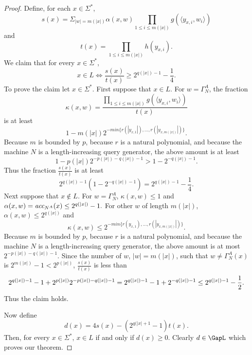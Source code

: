 \documentclass{amsbook}
\theoremstyle{definition}
\theoremstyle{remark}
\numberwithin{section}{chapter}
\numberwithin{equation}{chapter}
\newcommand{\acc}{\mbox{\it acc}}
\begin{document}
\begin{proof}
Define, for each $x\in\Sigma^*$,
\[
s(x)=\Sigma_{|w|=m(|x|)}\alpha (x,w)\prod_{1\leq i\leq m(|x|)}g(\langle y_{x,i},w_i\rangle )
\]
and
\[
t(x)=\prod_{1\leq i\leq m(|x|)}h(y_{x,i}).
\]
We claim that for every $x\in\Sigma^*$,
\[
x\in L\Leftrightarrow \frac{s(x)}{t(x)}\geq 2^{q(|x|)-1}-\frac{1}{4}.
\]
To prove the claim let $x\in\Sigma^*$. First suppose that $x\in L$. For $w=\Gamma_N^A$, the fraction
\[
\kappa (x,w)=\frac{\prod_{1\leq i\leq m(|x|)}g(\langle y_{x,i},w_i\rangle )}{t(x)}
\]
is at least
\[
1-m(|x|)2^{-min\{r(|y_{x,1}|),\ldots ,r(|y_{x,m(|x|)}|)\}}.
\]
Because $m$ is bounded by $p$, because $r$ is a natural polynomial, and because the machine $N$ is a length-increasing query generator, the above amount is at least
\[
1-p(|x|)2^{-p(|x|)-q(|x|)-1}>1-2^{-q(|x|)-1}.
\]
Thus the fraction $\frac{s(x)}{t(x)}$ is at least
\[
2^{q(|x|)-1}(1-2^{-q(|x|)-1})=2^{q(|x|)-1}-\frac{1}{4}.
\]
Next suppose that $x\not\in L$. For $w=\Gamma_N^A$, $\kappa(x,w)\leq 1$ and $\alpha (x,w)=\acc_{N^A}(x)\leq 2^{q(|x|)}-1.$ For other $w$ of length $m(|x|)$, $\alpha (x,w)\leq 2^{q(|x|)}$ and 
\[
\kappa (x,w)\leq 2^{-min\{r(y_{x,1}),\ldots ,r(|y_{x,m(|x|)}|)\}}.
\]
Because $m$ is bounded by $p$, because $r$ is a natural polynomial, and because the machine $N$ is a length-increasing query generator, the above amount is at most  $2^{-p(|x|)-q(|x|)-1}$. Since the number of $w$, $|w|=m(|x|)$, such that $w\neq \Gamma_N^A(x)$ is $2^{m(|x|)}-1<2^{p(|x|)}$, $\frac{s(x)}{t(x)}$ is less than
\[
2^{q(|x|)-1}-1+2^{p(|x|)}2^{-p(|x|)-q(|x|)-1}\\
=2^{q(|x|)-1}-1+2^{-q(|x|)-1}\\
\leq 2^{q(|x|)-1}-\frac{1}{2}.
\]
Thus the claim holds.

Now define
\[
d(x)=4s(x)-(2^{q(|x|+1}-1)t(x).
\]
Then, for every $x\in\Sigma^*$, $x\in L$ if and only if $d(x)\geq 0$. Clearly $d\in\GapL$ which proves our theorem.
\end{proof}
\end{document}
